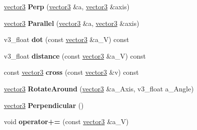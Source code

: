 \begin{DoxyCompactItemize}
\item 
\hyperlink{classns__phys_1_1vector3}{vector3} {\bfseries Perp} (\hyperlink{classns__phys_1_1vector3}{vector3} \&a, \hyperlink{classns__phys_1_1vector3}{vector3} \&axis)\hypertarget{classns__phys_1_1vector3_abf52ab9d0627cdd8884d2c8d49c40fe9}{}\label{classns__phys_1_1vector3_abf52ab9d0627cdd8884d2c8d49c40fe9}

\item 
\hyperlink{classns__phys_1_1vector3}{vector3} {\bfseries Parallel} (\hyperlink{classns__phys_1_1vector3}{vector3} \&a, \hyperlink{classns__phys_1_1vector3}{vector3} \&axis)\hypertarget{classns__phys_1_1vector3_a28a55e2a5e6850e89003bbe21730406e}{}\label{classns__phys_1_1vector3_a28a55e2a5e6850e89003bbe21730406e}

\item 
v3\+\_\+float {\bfseries dot} (const \hyperlink{classns__phys_1_1vector3}{vector3} \&a\+\_\+V) const \hypertarget{classns__phys_1_1vector3_aee16c6141ebec1fed72fed10bb567682}{}\label{classns__phys_1_1vector3_aee16c6141ebec1fed72fed10bb567682}

\item 
v3\+\_\+float {\bfseries distance} (const \hyperlink{classns__phys_1_1vector3}{vector3} \&a\+\_\+V) const \hypertarget{classns__phys_1_1vector3_a3b03f6f6a89e620eeba31101ea5ce206}{}\label{classns__phys_1_1vector3_a3b03f6f6a89e620eeba31101ea5ce206}

\item 
const \hyperlink{classns__phys_1_1vector3}{vector3} {\bfseries cross} (const \hyperlink{classns__phys_1_1vector3}{vector3} \&v) const \hypertarget{classns__phys_1_1vector3_a18019aac4001024458517bd0e14da302}{}\label{classns__phys_1_1vector3_a18019aac4001024458517bd0e14da302}

\item 
\hyperlink{classns__phys_1_1vector3}{vector3} {\bfseries Rotate\+Around} (\hyperlink{classns__phys_1_1vector3}{vector3} \&a\+\_\+\+Axis, v3\+\_\+float a\+\_\+\+Angle)\hypertarget{classns__phys_1_1vector3_a119ee69993f9b5cdea7cbc1651f25eeb}{}\label{classns__phys_1_1vector3_a119ee69993f9b5cdea7cbc1651f25eeb}

\item 
\hyperlink{classns__phys_1_1vector3}{vector3} {\bfseries Perpendicular} ()\hypertarget{classns__phys_1_1vector3_a2c31eaf6a91980bcf399e95315237c89}{}\label{classns__phys_1_1vector3_a2c31eaf6a91980bcf399e95315237c89}

\item 
void {\bfseries operator+=} (const \hyperlink{classns__phys_1_1vector3}{vector3} \&a\+\_\+V)\hypertarget{classns__phys_1_1vector3_ab84ea567244a7ac3fa6e02632b67619a}{}\label{classns__phys_1_1vector3_ab84ea567244a7ac3fa6e02632b67619a}


\end{DoxyCompactItemize}
